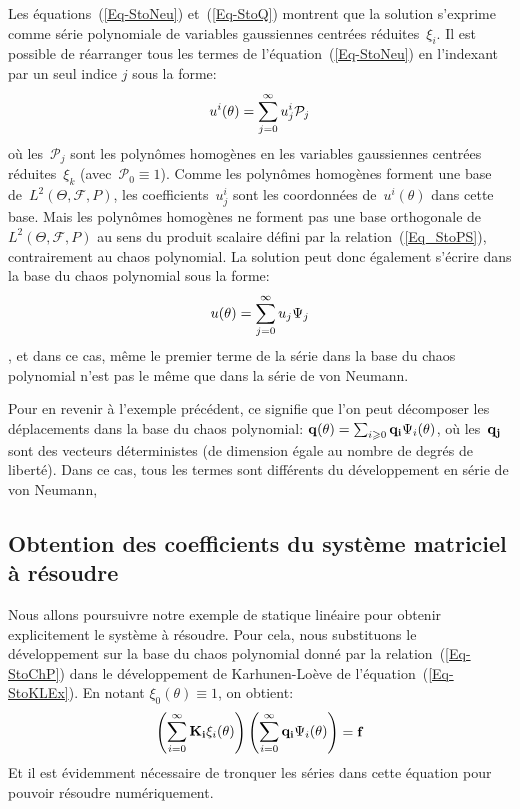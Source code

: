 Les équations~(\ref{Eq-StoNeu}) et~(\ref{Eq-StoQ}) montrent que la solution s'exprime comme série polynomiale de variables gaussiennes centrées réduites~$\xi_i$. 
Il est possible de réarranger tous les termes de l'équation~(\ref{Eq-StoNeu}) en l'indexant par un seul indice $j$ sous la forme:
\begin{equation}
u^i(\theta)=\displaystyle\sum_{j=0}^\infty u_j^i\mathcal{P}_j
\end{equation}
où les~$\mathcal{P}_j$ sont les polynômes homogènes en les variables gaussiennes centrées réduites~$\xi_k$ (avec~$\mathcal{P}_0\equiv1$).
Comme les polynômes homogènes forment une base de~$L^2(\Theta,\mathcal{F},P)$, les coefficients~$u_j^i$ sont les coordonnées de~$u^i(\theta)$ dans cette base.
Mais les polynômes homogènes ne forment pas une base orthogonale de~$L^2(\Theta,\mathcal{F},P)$ au sens du produit scalaire défini par la relation~(\ref{Eq_StoPS}), contrairement au chaos polynomial. 
La solution peut donc également s'écrire dans la base du chaos polynomial sous la forme:
\begin{equation}\label{Eq-StoChP}
u(\theta)=\displaystyle\sum_{j=0}^\infty u_j\Psi_j
\end{equation}
, et dans ce cas, même le premier terme de la série dans la base du chaos polynomial n'est pas le même que dans la série de von Neumann.

\medskip
Pour en revenir à l'exemple précédent, ce signifie que l'on peut décomposer les déplacements dans la base du chaos polynomial: $\VV{q(\theta)}=\sum_{i\ge0}\VV{q_i}\Psi_i(\theta)$, où les~$\VV{q_j}$ sont des vecteurs déterministes (de dimension égale au nombre de degrés de liberté). 
Dans ce cas, tous les termes sont différents du développement en série de von Neumann, 

\medskip
\subsection{Obtention des coefficients du système matriciel à résoudre}

Nous allons poursuivre notre exemple de statique linéaire pour obtenir explicitement le système à résoudre.
Pour cela, nous substituons le développement sur la base du chaos polynomial donné par la relation~(\ref{Eq-StoChP}) dans le développement de Karhunen-Loève de l'équation~(\ref{Eq-StoKLEx}). En notant $\xi_0(\theta)\equiv1$, on obtient:
\begin{equation}\label{Eq-StoEFEx}
\PP{\dsum_{i=0}^\infty \MM{K_i}\xi_i(\theta)}\PP{\dsum_{i=0}^\infty \VV{q_i}\Psi_i(\theta)} = \VV{f}
\end{equation}
Et il est évidemment nécessaire de tronquer les séries dans cette équation pour pouvoir résoudre numériquement.

